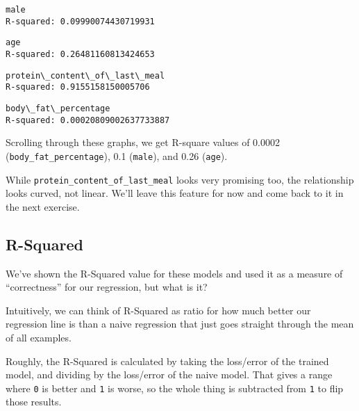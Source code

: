 \documentclass[11pt]{article}
\begin{document}
    \begin{Verbatim}[commandchars=\\\{\}]
male
R-squared: 0.09990074430719931
    \end{Verbatim}

    
    
    \begin{Verbatim}[commandchars=\\\{\}]
age
R-squared: 0.26481160813424653
    \end{Verbatim}

    
    
    \begin{Verbatim}[commandchars=\\\{\}]
protein\_content\_of\_last\_meal
R-squared: 0.9155158150005706
    \end{Verbatim}

    
    
    \begin{Verbatim}[commandchars=\\\{\}]
body\_fat\_percentage
R-squared: 0.00020809002637733887
    \end{Verbatim}

    
    
    Scrolling through these graphs, we get R-square values of 0.0002
(\texttt{body\_fat\_percentage}), 0.1 (\texttt{male}), and 0.26
(\texttt{age}).

While \texttt{protein\_content\_of\_last\_meal} looks very promising
too, the relationship looks curved, not linear. We'll leave this feature
for now and come back to it in the next exercise.

    \hypertarget{r-squared}{%
\subsection{R-Squared}\label{r-squared}}

We've shown the R-Squared value for these models and used it as a
measure of ``correctness'' for our regression, but what is it?

Intuitively, we can think of R-Squared as ratio for how much better our
regression line is than a naive regression that just goes straight
through the mean of all examples.

Roughly, the R-Squared is calculated by taking the loss/error of the
trained model, and dividing by the loss/error of the naive model. That
gives a range where \texttt{0} is better and \texttt{1} is worse, so the
whole thing is subtracted from \texttt{1} to flip those results.
\end{document}
